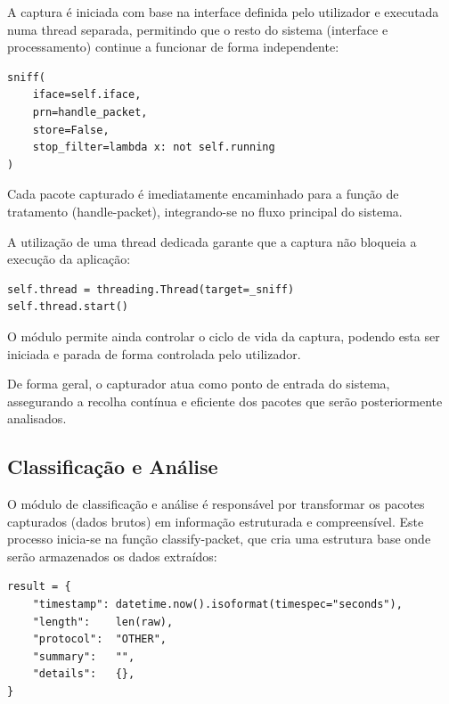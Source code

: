 \documentclass[a4paper]{article}
\begin{document}
A captura é iniciada com base na interface definida pelo utilizador e executada numa thread separada, permitindo que o resto do sistema (interface e processamento) continue a funcionar de forma independente:

\vspace{0.15cm}
\begin{lstlisting}
sniff(
    iface=self.iface,
    prn=handle_packet,
    store=False,
    stop_filter=lambda x: not self.running
)
\end{lstlisting}
\vspace{0.15cm}

Cada pacote capturado é imediatamente encaminhado para a função de tratamento (handle-packet), integrando-se no fluxo principal do sistema.

A utilização de uma thread dedicada garante que a captura não bloqueia a execução da aplicação:

\vspace{0.15cm}
\begin{lstlisting}
self.thread = threading.Thread(target=_sniff)
self.thread.start()
\end{lstlisting}
\vspace{0.15cm}

O módulo permite ainda controlar o ciclo de vida da captura, podendo esta ser iniciada e parada de forma controlada pelo utilizador.

De forma geral, o capturador atua como ponto de entrada do sistema, assegurando a recolha contínua e eficiente dos pacotes que serão posteriormente analisados.

\subsection{Classificação e Análise}
O módulo de classificação e análise é responsável por transformar os pacotes capturados (dados brutos) em informação estruturada e compreensível. Este processo inicia-se na função classify-packet, que cria uma estrutura base onde serão armazenados os dados extraídos:

\vspace{0.15cm}
\begin{lstlisting}
result = {
    "timestamp": datetime.now().isoformat(timespec="seconds"),
    "length":    len(raw),
    "protocol":  "OTHER",
    "summary":   "",
    "details":   {},
}
\end{lstlisting}
\vspace{0.15cm}
\end{document}
